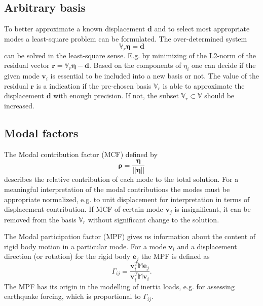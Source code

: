 \documentclass[conference]{journal}%
\newcommand{\bb}[1]{\mathbb{#1}}
\newcommand{\B}[1]{\mathbf{#1}}
\newcommand{\Bv}{\B{v}}
\newcommand{\Beta}{\boldsymbol{\eta}}
\newcommand{\Brho}{\boldsymbol{\rho}}
\newcommand{\M}{\bb{M}}
\begin{document}
	\subsection{Arbitrary basis}
	To better approximate a known displacement $\B{d}$ and to select most appropriate modes a least-square problem can be formulated. The over-determined system 
	\begin{equation}
	\bb{V}_r \Beta = \B{d}
	\end{equation}
	can be solved in the least-square sense. E.g. by minimizing of the L2-norm of the residual vector $\B{r} = \bb{V}_r \Beta - \B{d}$. Based on the components of $\eta_i$ one can decide if the given mode $\Bv_i$ is essential to be included into a new basis or not. The value of the residual $\B{r}$ is a indication if the pre-chosen basis $\bb{V}_r$ is able to approximate the displacement $\B{d}$ with enough precision. If not, the subset $\bb{V}_r \subset \bb{V}$ should be increased.
	
	\subsection{Modal factors}
	The Modal contribution factor (MCF) defined by
	\begin{equation} \label{eq:3MCF}
	\Brho = \frac{\Beta}{|| \Beta ||}
	\end{equation}
	describes the relative contribution of each mode to the total solution. For a meaningful interpretation of the modal contributions the modes must be appropriate normalized, e.g. to unit displacement for interpretation in terms of displacement contribution.	If MCF of certain mode $\Bv_j$ is insignificant, it can be removed from the basis $\bb{V}_r$ without significant change to the solution.
	
	The Modal participation factor (MPF) gives us information about the content of rigid body motion in a particular mode. For a mode $\Bv_i$ and a displacement direction (or rotation) for the rigid body $\B{e}_j$ the MPF is defined as
	\begin{equation} \label{eq:3MPF}
	\Gamma_{ij} = \frac{\Bv_i^T \M \B{e}_j}{\Bv_i^T \M \Bv_i}.
	\end{equation}
	The MPF has its origin in the modelling of inertia loads, e.g. for assessing earthquake forcing, which is proportional to $\Gamma_{ij}$.
	
	
\end{document}
